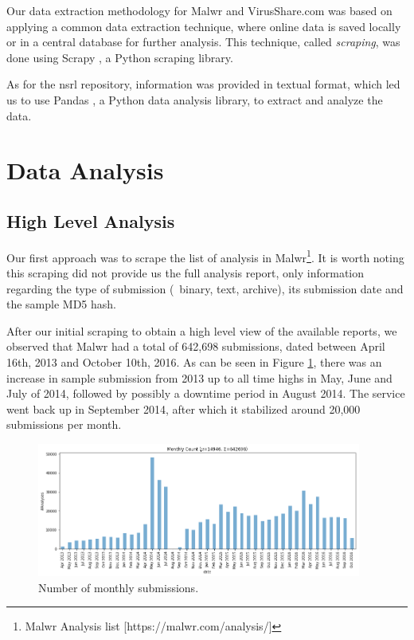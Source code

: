 Our data extraction methodology for Malwr and VirusShare.com was based on applying a common data extraction technique, where online data is saved locally or in a central database for further analysis. This technique, called \textit{scraping}, was done using Scrapy \cite{tool:scrapy}, a Python scraping library.

As for the \gls{nsrl} repository, information was provided in textual format, which led us to use Pandas \cite{tool:pandas}, a Python data analysis library, to extract and analyze the data.


\section{Data Analysis}
\label{section:data_analysis}

\subsection{High Level Analysis}
\label{subsection:high_level_analysis}

Our first approach was to scrape the list of analysis in Malwr\footnote{Malwr Analysis list [https://malwr.com/analysis/]}.
It is worth noting this scraping did not provide us the full analysis report, only information regarding the type of submission (\eg\ binary, text, archive), its submission date and the sample MD5 hash.

After our initial scraping to obtain a high level view of the available reports, we observed that Malwr had a total of 642,698 submissions, dated between April 16th, 2013 and October 10th, 2016. As can be seen in Figure \ref{fig:samples_count}, there was an increase in sample submission from 2013 up to all time highs in May, June and July of 2014, followed by possibly a downtime period in August 2014.
The service went back up in September 2014, after which it stabilized around 20,000 submissions per month.

\begin{figure}[!htb]
	\centering
	\includegraphics[width=0.95\textwidth]{Figures/samples_count.png}
	\caption[Number of monthly submissions.]{Number of monthly submissions.}
	\label{fig:samples_count}
\end{figure}

